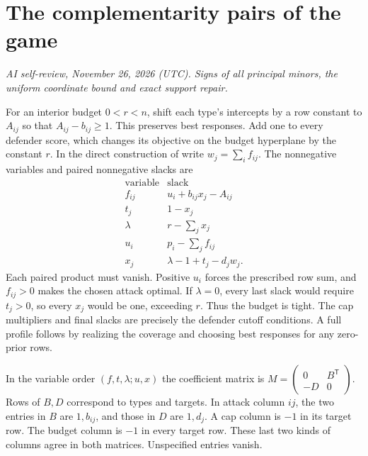 \documentclass[11pt,oneside,openany,notitlepage]{report}
\newcommand{\reviewdate}{November 26, 2026 (UTC)}
\newcommand{\reviewmark}[1]{\par\nopagebreak[4]\noindent
  {\footnotesize\itshape AI self-review, \reviewdate. #1\par}\nobreak\smallskip}
\begin{document}
\section{The complementarity pairs of the game}
\reviewmark{Signs of all principal minors, the uniform coordinate bound and exact support repair.}

For an interior budget \(0<r<n\), shift each type's intercepts by a
row constant to \(A_{ij}\) so that \(A_{ij}-b_{ij}\ge1\). This preserves
best responses. Add one to every defender score, which changes its
objective on the budget hyperplane by the constant \(r\). In the direct
construction of \cite[Theorem~5.19]{book} write \(w_j=\sum_i f_{ij}\).
The nonnegative variables and paired nonnegative slacks are
\[
\begin{array}{c|l}
 \text{variable}&\text{slack}\\ \hline
 f_{ij} & u_i+b_{ij}x_j-A_{ij}\\
 t_j & 1-x_j\\
 \lambda & r-\sum_jx_j\\
 u_i & p_i-\sum_jf_{ij}\\
 x_j & \lambda-1+t_j-d_jw_j .
\end{array}
\]
Each paired product must vanish. Positive \(u_i\) forces the prescribed
row sum, and \(f_{ij}>0\) makes the chosen attack optimal. If
\(\lambda=0\), every last slack would require \(t_j>0\), so every \(x_j\)
would be one, exceeding \(r\). Thus the budget is tight. The cap
multipliers and final slacks are precisely the defender cutoff
conditions. A full profile follows by realizing the coverage and choosing
best responses for any zero-prior rows.

In the variable order \((f,t,\lambda;u,x)\) the coefficient matrix is
\(M=\left(\begin{smallmatrix}0&B^{\mathsf T}\\-D&0\end{smallmatrix}\right)\).
Rows of \(B,D\) correspond to types and targets. In attack column \(ij\),
the two entries in \(B\) are \(1,b_{ij}\), and those in \(D\) are
\(1,d_j\). A cap column is \(-1\) in its target row. The budget column
is \(-1\) in every target row. These last two kinds of columns agree in
both matrices. Unspecified entries vanish.
\end{document}
